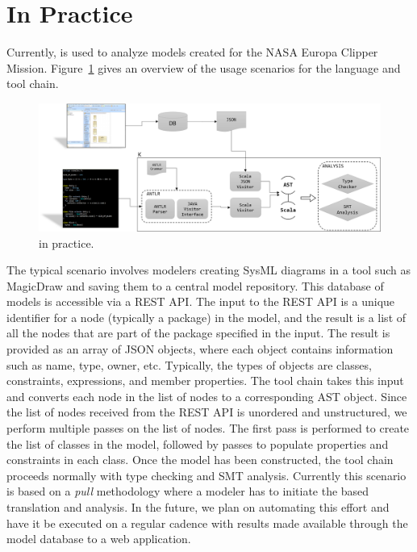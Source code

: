 \section{\Klang{} In Practice}
\label{sec:usage}

Currently, \Klang{} is used to analyze models created for the
NASA Europa Clipper Mission. Figure~\ref{fig:k} gives an overview of
the usage scenarios for the \Klang{} language and tool chain.

\begin{figure}
\centering
\includegraphics[scale=0.39]{K.png}
\caption{\Klang{} in practice.}
\label{fig:k}
\end{figure}

The typical scenario involves modelers creating SysML diagrams in a
tool such as MagicDraw and saving them to a central model
repository. This database of models is accessible via a REST API. The
input to the REST API is a unique identifier for a node (typically a
\sysml{} package) in the model, and the result is a list of all the
nodes that are part of the package specified in the input. The result
is provided as an array of JSON objects, where each object contains
information such as name, type, owner, etc. Typically, the types of
objects are classes, constraints, expressions, and member
properties. The \Klang{} tool chain takes this input and converts each
node in the list of nodes to a corresponding \Klang{} AST
object. Since the list of nodes received from the REST API is
unordered and unstructured, we perform multiple passes on
the list of nodes. The first pass is performed to create the list of
classes in the model, followed by passes to populate properties and
constraints in each class. Once the \Klang{} model has been
constructed, the \Klang{} tool chain proceeds normally with type
checking and SMT analysis. Currently this scenario is based on a {\em
  pull} methodology where a modeler has to initiate the \Klang{} based
translation and analysis. In the future, we plan on automating this
effort and have it be executed on a regular cadence with results made
available through the model database to a web application.

